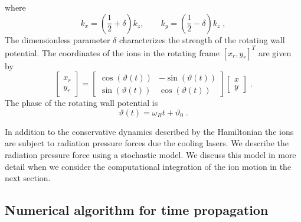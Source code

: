 \documentclass[aps, pra, twocolumn]{revtex4-1}
\begin{document}
where
\begin{equation}
k_x=\left(\frac{1}{2}+\delta\right)k_z,\qquad 
k_y=\left(\frac{1}{2}-\delta\right)k_z\;,
\end{equation}
The dimensionless parameter $\delta$ characterizes the strength
of the rotating wall potential. The coordinates of the ions in
the rotating frame $[x_r, y_r]^T$ are given by
\begin{equation}
\left[
\begin{array}{c}
x_r\\
y_r
\end{array}\right] =
\left[
\begin{array}{cc}
\cos(\vartheta(t)) & -\sin(\vartheta(t))\\
\sin(\vartheta(t)) & \cos(\vartheta(t))
\end{array}\right]
\left[\begin{array}{c}
x\\
y
\end{array}\right]\;.
\end{equation}
The phase of the rotating wall potential is
\begin{equation}
\vartheta(t)=\omega_R t+\vartheta_0\;.
\end{equation}

In addition to the conservative dynamics described by the
Hamiltonian the ions are subject to radiation pressure forces due
the cooling lasers. We describe the radiation pressure force
using a stochastic model. We discuss this model in more detail
when we consider the computational integration of the ion motion
in the next section.


\subsection{Numerical algorithm for time propagation}
\end{document}
